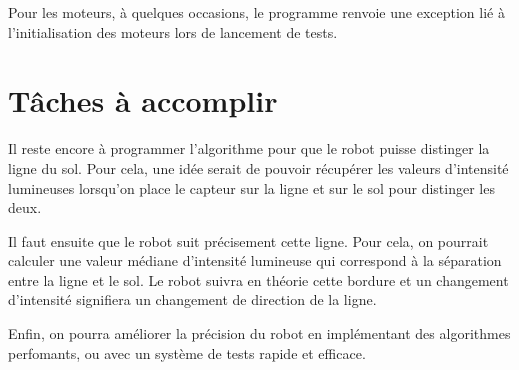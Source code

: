 \documentclass{article}
\begin{document}
Pour les moteurs, à quelques occasions, le programme renvoie une exception lié à l'initialisation des moteurs lors de lancement de tests.

\section{Tâches à accomplir}
Il reste encore à programmer l'algorithme pour que le robot puisse distinger la ligne du sol. Pour cela, une idée serait de pouvoir récupérer les valeurs d'intensité lumineuses lorsqu'on place le capteur sur la ligne et sur le sol pour distinger les deux.

Il faut ensuite que le robot suit précisement cette ligne. Pour cela, on pourrait calculer une valeur médiane d'intensité lumineuse qui correspond à la séparation entre la ligne et le sol. Le robot suivra en théorie cette bordure et un changement d'intensité signifiera un changement de direction de la ligne.

Enfin, on pourra améliorer la précision du robot en implémentant des algorithmes perfomants, ou avec un système de tests rapide et efficace.
\end{document}

